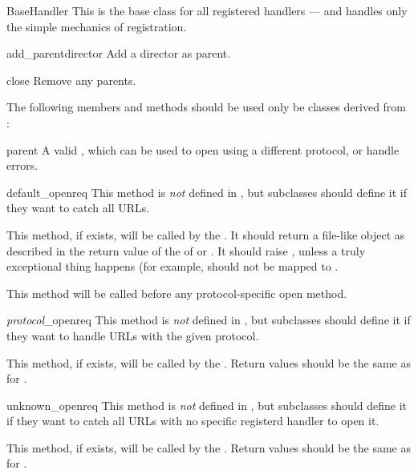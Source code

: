 \begin{classdesc}{BaseHandler}{}
This is the base class for all registered handlers --- and handles only
the simple mechanics of registration.
\end{classdesc}

\begin{methoddesc}[BaseHandler]{add_parent}{director}
Add a director as parent.
\end{methoddesc}

\begin{methoddesc}[BaseHandler]{close}{}
Remove any parents.
\end{methoddesc}

The following members and methods should be used only be classes derived
from :

\begin{memberdesc}[BaseHandler]{parent}
A valid , which can be used to open using a different
protocol, or handle errors.
\end{memberdesc}

\begin{methoddesc}[BaseHandler]{default_open}{req}
This method is {\em not} defined in , but subclasses
should define it if they want to catch all URLs.

This method, if exists, will be called by the  
. It should return a file-like object as described
in the return value of the  of  or
. It should raise , unless a truly exceptional
thing happens (for example,  should not be mapped
to .

This method will be called before any protocol-specific open method.
\end{methoddesc}

\begin{methoddesc}[BaseHandler]{{\em protocol}_open}{req}
This method is {\em not} defined in , but subclasses
should define it if they want to handle URLs with the given protocol.

This method, if exists, will be called by the  
. Return values should be the same as for 
.
\end{methoddesc}

\begin{methoddesc}[BaseHandler]{unknown_open}{req}
This method is {\em not} defined in , but subclasses
should define it if they want to catch all URLs with no specific
registerd handler to open it.

This method, if exists, will be called by the  
. Return values should be the same as for 
.
\end{methoddesc}

